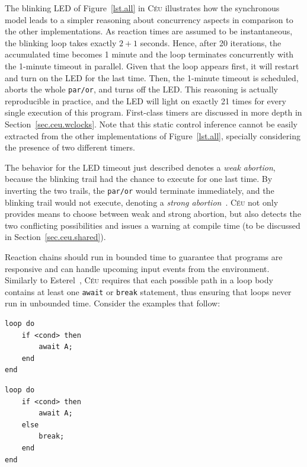 \documentclass[letterpaper]{sig-alternate}
\newcommand{\code}[1] {{\small{\texttt{#1}}}}
\newcommand{\CEU}{\textsc{C\'{e}u}\xspace}
\begin{document}
The blinking LED of Figure~\ref{lst.all} in \CEU illustrates how the 
synchronous model leads to a simpler reasoning about concurrency aspects in 
comparison to the other implementations.
As reaction times are assumed to be instantaneous, the blinking loop takes 
exactly $2+1$ seconds.
Hence, after 20 iterations, the accumulated time becomes 1 minute and the loop 
terminates concurrently with the 1-minute timeout in parallel.
Given that the loop appears first, it will restart and turn on the LED for the 
last time.
Then, the 1-minute timeout is scheduled, aborts the whole \code{par/or}, and 
turns off the LED.
%
This reasoning is actually reproducible in practice, and the LED will light on 
exactly 21 times for every single execution of this program.
First-class timers are discussed in more depth in 
Section~\ref{sec.ceu.wclocks}.
%
Note that this static control inference cannot be easily extracted from the 
other implementations of Figure~\ref{lst.all}, specially considering the 
presence of two different timers.

The behavior for the LED timeout just described denotes a \emph{weak abortion}, 
because the blinking trail had the chance to execute for one last time.
By inverting the two trails, the \code{par/or} would terminate immediately, and 
the blinking trail would not execute, denoting a \emph{strong 
abortion}~\cite{esterel.preemption}.
%
\CEU not only provides means to choose between weak and strong abortion, but 
also detects the two conflicting possibilities and issues a warning at compile 
time (to be discussed in Section~\ref{sec.ceu.shared}).

Reaction chains should run in bounded time to guarantee that programs are 
responsive and can handle upcoming input events from the environment.
Similarly to Esterel~\cite{esterel.ieee91}, \CEU requires that each possible 
path in a loop body contains at least one \code{await} or \code{break} 
statement, thus ensuring that loops never run in unbounded time.
%
Consider the examples that follow:

\nopagebreak
\noindent
\begin{minipage}[t]{0.45\linewidth}
\begin{lstlisting}
loop do
    if <cond> then
        await A;
    end
end
\end{lstlisting}
\end{minipage}
%
\begin{minipage}[t]{0.45\linewidth}
\begin{lstlisting}
loop do
    if <cond> then
        await A;
    else
        break;
    end
end
\end{lstlisting}
\end{minipage}
\end{document}

